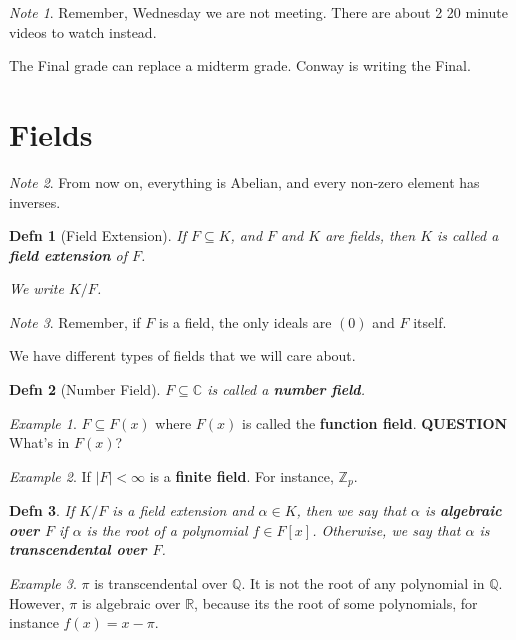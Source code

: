 \documentclass[12pt]{article}
\def\Z{{\mathbb Z}}
\def\Q{{\mathbb Q}}
\def\R{{\mathbb R}}
\def\C{{\mathbb C}}
\def\QUESTION{\color{red}\textbf{QUESTION}\color{black}\,}
\newtheorem{definition}{Defn}
\theoremstyle{remark}
\theoremstyle{remark}
\theoremstyle{remark}
\newtheorem{example}{Example}
\theoremstyle{remark}
\theoremstyle{remark}
\newtheorem*{note}{Note}
\begin{document}
\begin{note}
  Remember, Wednesday we are not meeting. There are about 2 20 minute videos to
  watch instead.

  The Final grade can replace a midterm grade. Conway is writing the Final.
\end{note}

\section{Fields}

\begin{note}
  From now on, everything is Abelian, and every non-zero element has inverses.
\end{note}

\begin{definition}[Field Extension]
  If $F \subseteq K$, and $F$ and $K$ are fields, then $K$ is called a {\bf
  field extension} of $F$.

  We write $K / F$.
\end{definition}

\begin{note}
  Remember, if $F$ is a field, the only ideals are $(0)$ and $F$ itself.
\end{note}

We have different types of fields that we will care about.

\begin{definition}[Number Field]
  $F \subseteq \C$ is called a {\bf number field}.
\end{definition}

\begin{example}
  $F \subseteq F(x)$ where $F(x)$ is called the {\bf function field}.
  \QUESTION What's in $F(x)$?
\end{example}

\begin{example}
  If $|F| < \infty$ is a {\bf finite field}. For instance, $\Z_p$.
\end{example}

\begin{definition}
  If $K / F$ is a field extension and $\alpha \in K$, then we say that $\alpha$
  is {\bf algebraic over $F$} if $\alpha$ is the root of a polynomial $f \in
  F[x]$. Otherwise, we say that $\alpha$ is {\bf transcendental over $F$}.
\end{definition}

\begin{example}
  $\pi$ is transcendental over $\Q$. It is not the root of any polynomial in
  $\Q$. However, $\pi$ is algebraic over $\R$, because its the root of some
  polynomials, for instance $f(x) = x - \pi$.
\end{example}
\end{document}
